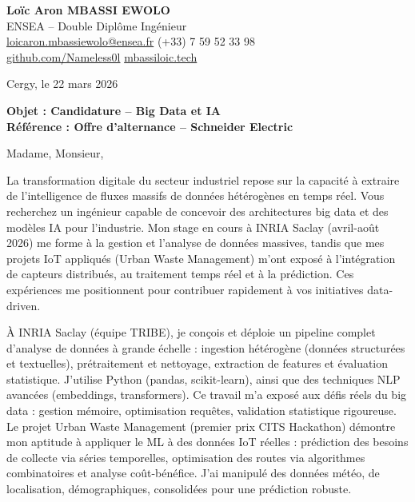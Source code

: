 \documentclass[a4paper,11pt]{article}
\begin{document}
\noindent
\textbf{Loïc Aron MBASSI EWOLO} \\
ENSEA -- Double Diplôme Ingénieur \\
\href{mailto:loicaron.mbassiewolo@ensea.fr}{loicaron.mbassiewolo@ensea.fr} \quad (+33) 7 59 52 33 98 \\
\href{https://github.com/Nameless0l}{github.com/Nameless0l} \quad \href{https://mbassiloic.tech}{mbassiloic.tech}

\vspace{1em}
\noindent Cergy, le 22 mars 2026

\vspace{1em}
\noindent
\textbf{Objet : Candidature -- Big Data et IA} \\
\textbf{Référence : Offre d'alternance -- Schneider Electric}

\vspace{1.5em}
\noindent Madame, Monsieur,

\vspace{0.8em}
La transformation digitale du secteur industriel repose sur la capacité à extraire de l'intelligence de fluxes massifs de données hétérogènes en temps réel. Vous recherchez un ingénieur capable de concevoir des architectures big data et des modèles IA pour l'industrie. Mon stage en cours à INRIA Saclay (avril-août 2026) me forme à la gestion et l'analyse de données massives, tandis que mes projets IoT appliqués (Urban Waste Management) m'ont exposé à l'intégration de capteurs distribués, au traitement temps réel et à la prédiction. Ces expériences me positionnent pour contribuer rapidement à vos initiatives data-driven.

\vspace{0.8em}
À INRIA Saclay (équipe TRIBE), je conçois et déploie un pipeline complet d'analyse de données à grande échelle : ingestion hétérogène (données structurées et textuelles), prétraitement et nettoyage, extraction de features et évaluation statistique. J'utilise Python (pandas, scikit-learn), ainsi que des techniques NLP avancées (embeddings, transformers). Ce travail m'a exposé aux défis réels du big data : gestion mémoire, optimisation requêtes, validation statistique rigoureuse. Le projet Urban Waste Management (premier prix CITS Hackathon) démontre mon aptitude à appliquer le ML à des données IoT réelles : prédiction des besoins de collecte via séries temporelles, optimisation des routes via algorithmes combinatoires et analyse coût-bénéfice. J'ai manipulé des données météo, de localisation, démographiques, consolidées pour une prédiction robuste.
\end{document}
